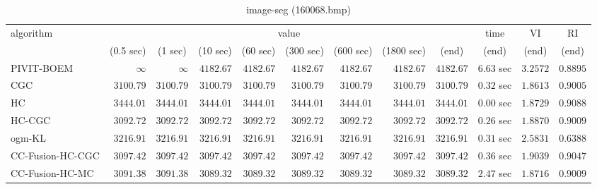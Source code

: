 \begin{table}[H]
\scriptsize
\centering
\caption{image-seg (160068.bmp)}
\label{tab:anytimetable-image-seg-160068.bmp}
\begin{tabular}{lrrrrrrrrrrr}
\toprule
           algorithm &                                   \multicolumn{8}{c}{value} & \multicolumn{1}{c}{time}    & \multicolumn{1}{c}{VI}  & \multicolumn{1}{c}{RI} \\  
\cmidrule(lr){2-9}\cmidrule(lr){10-10} \cmidrule(lr){11-11} \cmidrule(lr){12-12}   
                     & \multicolumn{1}{c}{(0.5 sec)} & \multicolumn{1}{c}{(1 sec)} & \multicolumn{1}{c}{(10 sec)} & \multicolumn{1}{c}{(60 sec)} & \multicolumn{1}{c}{(300 sec)} & \multicolumn{1}{c}{(600 sec)} & \multicolumn{1}{c}{(1800 sec)} & \multicolumn{1}{c}{(end)} & \multicolumn{1}{c}{(end)}    & \multicolumn{1}{c}{(end)}   & \multicolumn{1}{c}{(end)}  \\ \midrule 
          PIVIT-BOEM & $\infty$ & $\infty$ & $      4182.67$ & $      4182.67$ & $      4182.67$ & $      4182.67$ & $      4182.67$ & $      4182.67$ & $         6.63$ sec    & $       3.2572$  & $       0.8895$ \\ 
                 CGC & $      3100.79$ & $      3100.79$ & $      3100.79$ & $      3100.79$ & $      3100.79$ & $      3100.79$ & $      3100.79$ & $      3100.79$ & $         0.32$ sec    & $       1.8613$  & $       0.9005$ \\ 
                  HC & $      3444.01$ & $      3444.01$ & $      3444.01$ & $      3444.01$ & $      3444.01$ & $      3444.01$ & $      3444.01$ & $      3444.01$ & $         0.00$ sec    & $       1.8729$  & $       0.9088$ \\ 
              HC-CGC & $      3092.72$ & $      3092.72$ & $      3092.72$ & $      3092.72$ & $      3092.72$ & $      3092.72$ & $      3092.72$ & $      3092.72$ & $         0.26$ sec    & $       1.8870$  & $       0.9009$ \\ 
              ogm-KL & $      3216.91$ & $      3216.91$ & $      3216.91$ & $      3216.91$ & $      3216.91$ & $      3216.91$ & $      3216.91$ & $      3216.91$ & $         0.31$ sec    & $       2.5831$  & $       0.6388$ \\ 
    CC-Fusion-HC-CGC & $      3097.42$ & $      3097.42$ & $      3097.42$ & $      3097.42$ & $      3097.42$ & $      3097.42$ & $      3097.42$ & $      3097.42$ & $         0.36$ sec    & $       1.9039$  & $       0.9047$ \\ 
     CC-Fusion-HC-MC & $      3091.38$ & $      3091.38$ & $      3089.32$ & $      3089.32$ & $      3089.32$ & $      3089.32$ & $      3089.32$ & $      3089.32$ & $         2.47$ sec    & $       1.8716$  & $       0.9009$ \\ 

\end{tabular}
\end{table}
